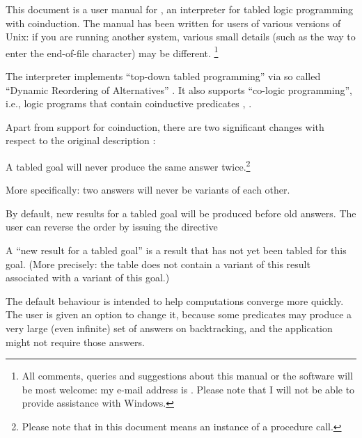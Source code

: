 

This document is a user manual for , an interpreter for tabled
logic programming with coinduction.  The manual has been written for users of
various versions of Unix: if you are running another system, various small
details (such as the way to enter the end-of-file character) may be
different.%
\footnote{
  All comments, queries and suggestions about this manual or the software
  will be most welcome: my e-mail address is
  .  Please note that I will not be able
  to provide assistance with Windows.}

The interpreter implements ``top-down tabled programming'' via so called
``Dynamic Reordering of Alternatives'' \cite{guo-gupta-dra}.  It also
supports ``co-logic programming'', i.e., logic programs that contain
coinductive predicates \cite{coinductive}, \cite{co-LP}.


Apart from support for coinduction, there are two significant changes with
respect to the original description \cite{guo-gupta-dra}:
\begin{Enumerate}

\item
  A tabled goal will never produce the same answer twice.\footnote{
  Please note that in this document  means an instance of a
  procedure call.}

  More specifically: two answers will never be variants of each
  other.

\item
  By default, new results for a tabled goal will be produced before old
  answers.  The user can reverse the order by issuing the directive\\
  \ind{}

  A ``new result for a tabled goal''\label{new-result} is a result that has
  not yet been tabled for this goal.  (More precisely: the table does not
  contain a variant of this result associated with a variant of this goal.)

  The default behaviour is intended to help computations converge more
  quickly.  The user is given an option to change it, because some predicates
  may produce a very large (even infinite) set of answers on backtracking,
  and the application might not require those answers.
\end{Enumerate}


%
%

